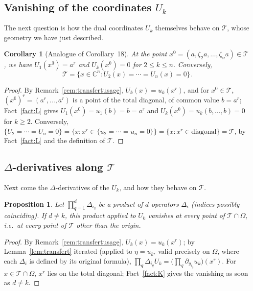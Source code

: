 \documentclass[11pt]{article}
\newtheorem{proposition}[theorem]{Proposition}
\newtheorem{corollary}[theorem]{Corollary}
\theoremstyle{remark}
\newcommand{\CC}{\mathbb{C}}
\begin{document}
\subsection{Vanishing of the coordinates $U_k$}

The next question is how the dual coordinates $U_k$ themselves behave on $\mathcal T$, whose geometry we have just described.

\begin{corollary}[Analogue of Corollary~18]\label{cor:diag}
At the point $x^0=(a,\zeta_2a,\dots,\zeta_na)\in\mathcal T$, we have $U_1(x^0)=a^r$ and $U_k(x^0)=0$ for $2\le k\le n$. Conversely,
\[
\mathcal T = \{x\in\CC^n : U_2(x)=\cdots=U_n(x)=0\}.
\]
\end{corollary}

\begin{proof}
By Remark~\ref{rem:transfertusage}, $U_k(x)=u_k(x^r)$, and for $x^0\in\mathcal T$, $(x^0)^r=(a^r,\dots,a^r)$ is a point of the total diagonal, of common value $b=a^r$; Fact~\ref{fact:L} gives $U_1(x^0)=u_1(b)=b=a^r$ and $U_k(x^0)=u_k(b,\dots,b)=0$ for $k\ge2$. Conversely, $\{U_2=\cdots=U_n=0\}=\{x : x^r\in\{u_2=\cdots=u_n=0\}\}=\{x:x^r\in\text{diagonal}\}=\mathcal T$, by Fact~\ref{fact:L} and the definition of $\mathcal T$.
\end{proof}

\subsection{$\Delta$-derivatives along $\mathcal T$}

Next come the $\Delta$-derivatives of the $U_k$, and how they behave on $\mathcal T$.

\begin{proposition}\label{prop:thm16delta}
Let $\prod_{q=1}^d \Delta_{i_q}$ be a product of $d$ operators $\Delta_i$ (indices possibly coinciding). If $d\ne k$, this product applied to $U_k$ vanishes at every point of $\mathcal T\cap\Omega$, i.e.\ at every point of $\mathcal T$ other than the origin.
\end{proposition}

\begin{proof}
By Remark~\ref{rem:transfertusage}, $U_k(x)=u_k(x^r)$; by Lemma~\ref{lem:transfert} iterated (applied to $\eta=u_k$, valid precisely on $\Omega$, where each $\Delta_i$ is defined by its original formula), $\prod_q\Delta_{i_q}U_k = \big(\prod_q \partial_{y_{i_q}}u_k\big)(x^r)$. For $x\in\mathcal T\cap\Omega$, $x^r$ lies on the total diagonal; Fact~\ref{fact:K} gives the vanishing as soon as $d\ne k$.
\end{proof}
\end{document}
